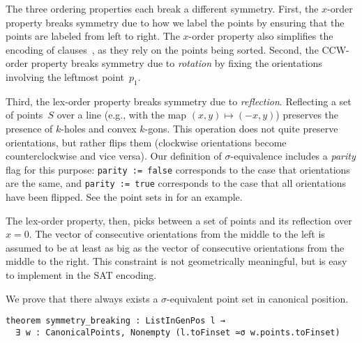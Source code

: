 The three ordering properties each break a different symmetry.
First, the $x$-order property breaks symmetry due to how we label the points by ensuring that the points are labeled from left to right.
The $x$-order property also simplifies the encoding of clauses~,
as they rely on the points being sorted.
Second, the CCW-order property breaks symmetry due to \emph{rotation} by fixing the orientations involving the leftmost point~$p_1$.



Third, the lex-order property breaks symmetry due to \emph{reflection}.
Reflecting a set of points~$S$ over a line (e.g., with the map $(x, y) \mapsto (-x, y)$)
preserves the presence of $k$-holes and convex $k$-gons.
This operation does not quite preserve orientations, but rather flips them
(clockwise orientations become counterclockwise and vice versa).
Our definition of $\sigma$-equivalence includes a \emph{parity} flag for this purpose:
\lstinline|parity := false| corresponds to the case that orientations are the same,
and \lstinline|parity := true| corresponds to the case that all orientations have been flipped.
See the point sets in  for an example.

The lex-order property, then, picks between a set of points and its reflection over \(x=0\).
The vector of consecutive orientations from the middle to the left
is assumed to be at least as big as the vector of consecutive orientations from the middle to the right.
This constraint is not geometrically meaningful,
but is easy to implement in the SAT encoding.

We prove that there always exists a $\sigma$-equivalent point set in canonical position.


\begin{lstlisting}
theorem symmetry_breaking : ListInGenPos l →
  ∃ w : CanonicalPoints, Nonempty (l.toFinset ≃σ w.points.toFinset)
\end{lstlisting}


